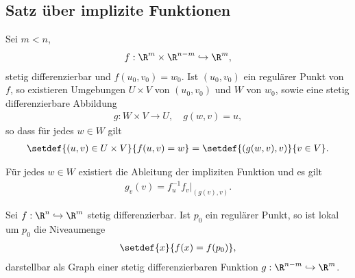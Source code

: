 \subsection{Satz über implizite Funktionen}

\begin{prop}
Sei $m<n$,
\begin{align*}
f : \R^m\times\R^{n-m} \hookrightarrow \R^m,
\end{align*}
stetig differenzierbar und $f(u_0,v_0) = w_0$. Ist $(u_0,v_0)$ ein regulärer
Punkt von $f$, so existieren Umgebungen $U\times V$ von $(u_0,v_0)$ und $W$ von
$w_0$, sowie eine stetig differenzierbare Abbildung
\begin{align*}
g: W\times V \to U,\quad g(w,v) = u,
\end{align*}
so dass für jedes $w\in W$ gilt
\begin{align*}
\setdef{(u,v)\in U\times V}{f(u,v) = w} = \setdef{(g(w,v),v)}{v\in V}.
\end{align*}
\end{prop}
\begin{prop}
Für jedes $w\in W$ existiert die Ableitung der impliziten Funktion und es gilt
\begin{align*}
g_v(v) = f_u^{-1}f_v\big|_{(g(v),v)}.
\end{align*}
\end{prop}
\begin{prop}
Sei $f:\R^n\hookrightarrow\R^m$ stetig differenzierbar. Ist $p_0$ ein regulärer
Punkt, so ist lokal um $p_0$ die Niveaumenge
\begin{align*}
\setdef{x}{f(x) = f(p_0)},
\end{align*}
darstellbar als Graph einer stetig differenzierbaren Funktion $g:
\R^{n-m}\hookrightarrow\R^m$.
\end{prop}